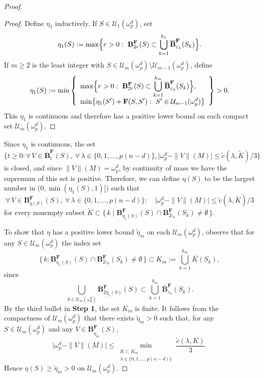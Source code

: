 \documentclass[10pt,a4paper]{amsart}
\begin{document}
\begin{proof}
\begin{proof}
Define \(\eta_1\) inductively. If \(S\in\mathcal{U}_1(\omega^d_p)\), set
\[
    \eta_1(S):=\max\Bigl\{r>0:\ \mathbf{B}^\mathbf{F}_{2r}(S)\subset \bigcup_{k=1}^{k_1}\overline{\mathbf{B}}^\mathbf{F}_{\varepsilon_k}(S_k)\Bigr\}.
\]
If \(m\ge2\) is the least integer with \(S\in \mathcal{U}_m(\omega^d_p)\setminus \mathcal{U}_{m-1}(\omega^d_p)\), define
\[
    \eta_1(S):=\min\left\{
    \begin{array}{l}
    \displaystyle \max\Bigl\{r>0:\ \mathbf{B}^\mathbf{F}_{2r}(S)\subset \bigcup_{k=1}^{k_m}\overline{\mathbf{B}}^\mathbf{F}_{\varepsilon_k}(S_k)\Bigr\},\\[6pt]
    \displaystyle \min\bigl\{\eta_1(S')+\mathbf{F}(S,S'):\ S'\in \mathcal{U}_{m-1}(\omega^d_p)\bigr\}
    \end{array}\right\}>0.
\]
This \(\eta_1\) is continuous and therefore has a positive lower bound on each compact set \(\mathcal{U}_m(\omega^d_p)\).
\end{proof}

Since $\eta_1$ is continuous, the set $\{t\geq0: \forall\, V\in \overline{\mathbf{B}}^\mathbf{F}_{t}(S),\ \forall\,\lambda\in\{0,1,\dots,p(n-d)\},\bigl|\omega^d_p-\|V\|(M)\bigr|\le \tilde c(\lambda,\tilde K)/3\}$ is closed, and since $\|V\|(M)=\omega^d_p$, by continuity of mass we have the supremum of this set is positive. Therefore, we can define \(\eta(S)\) to be the largest number in \(\bigl(0,\min(\eta_1(S),1)]\bigr)\) such that
\[
    \forall\, V\in \mathbf{B}^\mathbf{F}_{\eta(S)}(S),\ \forall\,\lambda\in\{0,1,\dots,p(n-d)\}:\quad
    \bigl|\omega^d_p-\|V\|(M)\bigr|\le \tilde c(\lambda,\tilde K)/3
\]
for every nonempty subset \(\tilde K\subset \{\,k\mid \mathbf{B}^\mathbf{F}_{\eta_1(S)}(S)\cap \mathbf{B}^\mathbf{F}_{2\varepsilon_k}(S_k)\neq\emptyset\,\}\).

To show that \(\eta\) has a positive lower bound \(\tilde\eta_m\) on each \(\mathcal{U}_m(\omega^d_p)\), observe that for any \(S\in\mathcal{U}_m(\omega^d_p)\) the index set
\[
    \{\,k : \mathbf{B}^\mathbf{F}_{\eta_1(S)}(S)\cap \mathbf{B}^\mathbf{F}_{2\varepsilon_k}(S_k)\neq\emptyset\,\}
    \subset K_m:=\bigcup_{k=1}^{k_m}\bar K(S_k),
\]
since
\[\displaystyle \bigcup_{S\in\mathcal{U}_m(\omega^d_p)}\mathbf{B}^\mathbf{F}_{2\eta_1(S)}(S)\subset \bigcup_{k=1}^{k_m}\overline{\mathbf{B}}^\mathbf{F}_{\varepsilon_k}(S_k).\]
By the third bullet in \textbf{Step 1}, the set \(K_m\) is finite. It follows from the compactness of \(\mathcal{U}_m(\omega^d_p)\) that there exists \(\tilde\eta_m>0\) such that, for any \(S\in\mathcal{U}_m(\omega^d_p)\) and any \(V\in \mathbf{B}^\mathbf{F}_{\tilde\eta_m}(S)\),
\[
    \bigl|\omega^d_p-\|V\|(M)\bigr|\le \min_{\substack{K\subset K_m\\ \lambda\in\{0,1,\dots,p(n-d)\}}}\frac{\tilde c(\lambda,K)}{3}.
\]
Hence \(\eta(S)\ge \tilde\eta_m>0\) on \(\mathcal{U}_m(\omega^d_p)\).


\end{proof}
\end{document}
